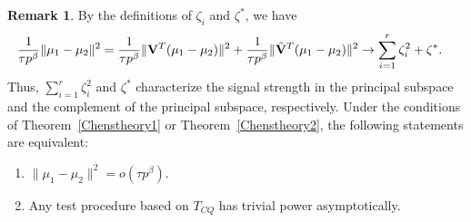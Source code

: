 \documentclass[3p]{elsarticle}
\theoremstyle{plain}
\newtheorem{theorem}{\quad\quad Theorem}
\theoremstyle{definition}
\newtheorem{remark}{\quad\quad Remark}
\theoremstyle{remark}
\begin{document}
\begin{remark}\label{remark1}
    By the definitions of $\zeta_i$ and $\zeta^*$, we have
    $$
    \begin{aligned}
        &\frac{1}{\tau p^{\beta}}\|\mu_1-\mu_2\|^2
    =
    \frac{1}{\tau p^{\beta}}\|\mathbf{V}^T (\mu_1-\mu_2)\|^2
        +
        \frac{1}{\tau p^{\beta}}\|\tilde{\mathbf{V}}^T (\mu_1-\mu_2)\|^2
    \to \sum_{i=1}^r \zeta_i^2+ \zeta^*.
    \end{aligned}
    $$
    Thus, $\sum_{i=1}^r\zeta_i^2$ and $\zeta^*$ characterize the signal strength in the principal subspace and the complement of the principal subspace, respectively.
    Under the conditions of Theorem~\ref{Chenstheory1} or Theorem~\ref{Chenstheory2}, the following statements are equivalent:
    \begin{enumerate}[(1)]
 \item
     $\|\mu_1-\mu_2\|^2=o(\tau p^{\beta})$.
        \item
            Any test procedure based on $T_{CQ}$ has trivial power asymptotically.
    \end{enumerate}
\end{remark}
\end{document}
